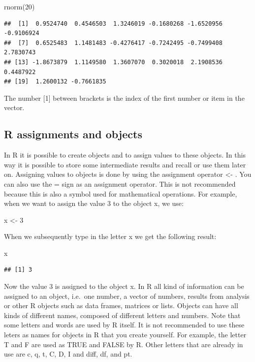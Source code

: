 \documentclass[
]{book}
\newenvironment{Shaded}{\begin{snugshade}}{\end{snugshade}}
\newcommand{\DecValTok}[1]{\textcolor[rgb]{0.00,0.00,0.81}{#1}}
\newcommand{\FunctionTok}[1]{\textcolor[rgb]{0.00,0.00,0.00}{#1}}
\newcommand{\NormalTok}[1]{#1}
\newcommand{\OtherTok}[1]{\textcolor[rgb]{0.56,0.35,0.01}{#1}}
\begin{document}
\begin{Shaded}
\begin{Highlighting}[]
\FunctionTok{rnorm}\NormalTok{(}\DecValTok{20}\NormalTok{)}
\end{Highlighting}
\end{Shaded}

\begin{verbatim}
##  [1]  0.9524740  0.4546503  1.3246019 -0.1680268 -1.6520956 -0.9106924
##  [7]  0.6525483  1.1481483 -0.4276417 -0.7242495 -0.7499408  2.7830743
## [13] -1.8673879  1.1149580  1.3607070  0.3020018  2.1908536  0.4487922
## [19]  1.2600132 -0.7661835
\end{verbatim}

The number {[}1{]} between brackets is the index of the first number or item in the vector.

\hypertarget{r-assignments-and-objects}{%
\subsection{R assignments and objects}\label{r-assignments-and-objects}}

In R it is possible to create objects and to assign values to these objects. In this way it is possible to store some intermediate results and recall or use them later on. Assigning values to objects is done by using the assignment operator \textless- . You can also use the = sign as an assignment operator. This is not recommended because this is also a symbol used for mathematical operations. For example, when we want to assign the value 3 to the object x, we use:

\begin{Shaded}
\begin{Highlighting}[]
\NormalTok{x }\OtherTok{\textless{}{-}} \DecValTok{3} 
\end{Highlighting}
\end{Shaded}

When we subsequently type in the letter x we get the following result:

\begin{Shaded}
\begin{Highlighting}[]
\NormalTok{x }
\end{Highlighting}
\end{Shaded}

\begin{verbatim}
## [1] 3
\end{verbatim}

Now the value 3 is assigned to the object x. In R all kind of information can be assigned to an object, i.e.~one number, a vector of numbers, results from analysis or other R objects such as data frames, matrices or lists. Objects can have all kinds of different names, composed of different letters and numbers. Note that some letters and words are used by R itself. It is not recommended to use these leters as names for objects in R that you create yourself. For example, the letter T and F are used as TRUE and FALSE by R. Other letters that are already in use are c, q, t, C, D, I and diff, df, and pt.
\end{document}
